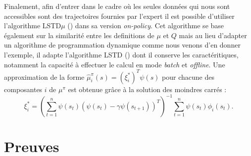 \documentclass[publibook-draft]{CAp2012}
\begin{document}
Finalement, afin d'entrer dans le cadre où les seules données qui nous sont accessibles sont des trajectoires fournies par l'expert il est possible d'utiliser l'algorithme LSTD$\mu$ (\citep{klein2011batch}) dans sa version \emph{on-policy}. Cet algorithme se base également sur la similarité entre les definitions de $\mu$ et $Q$ mais au lieu d'adapter un algorithme de programmation dynamique comme nous venons d'en donner l'exemple, il adapte l'algorithme LSTD (\cite{bradtke1996linear}) dont il conserve les caractéritiques, notamment la capacité à effectuer le calcul en mode {\it batch} et {\it offline}. Une approximation de la forme $\hat{\mu}_i^\pi(s) = (\xi_i^*)^T \psi(s)$ pour chacune des composantes $i$ de $\mu^\pi$ est obtenue grâce à la solution des moindres carrés : 
\begin{equation}
  \xi_i^* = \left(\sum_{t=1}^n
  \psi(s_t)(\psi(s_t)-\gamma\psi(s_{t+1}))^T\right)^{-1}
  \sum_{t=1}^n \psi(s_t) \phi_i(s_t).
\end{equation}

\section{Preuves}\label{proof.sec}
\end{document}
